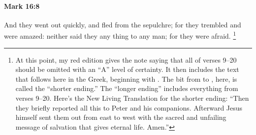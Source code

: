 			\begin{framed}
			\scriptsize
				\begin{compactdesc}
					\item[SBLG] 
				\end{compactdesc}
			\end{framed}

		\paragraph{Mark 16:8} %
			\label{MARK-16-8}

			And they went out quickly, and fled from the sepulchre; for they trembled and were amazed: neither said they any thing to any man; for they were afraid.%
				\footnote{%
					At this point, my red edition gives the note saying that all of verses 9--20 should be omitted with an ``A'' level of certainty. It then includes the text that follows here in the Greek, beginning with \gr{Πάντα}. The bit from  to , here, is called the ``shorter ending.'' The ``longer ending'' includes everything from verses 9--20. Here's the New Living Translation for the shorter ending: ``Then they briefly reported all this to Peter and his companions. Afterward Jesus himself sent them out from east to west with the sacred and unfailing message of salvation that gives eternal life. Amen.''
					}

